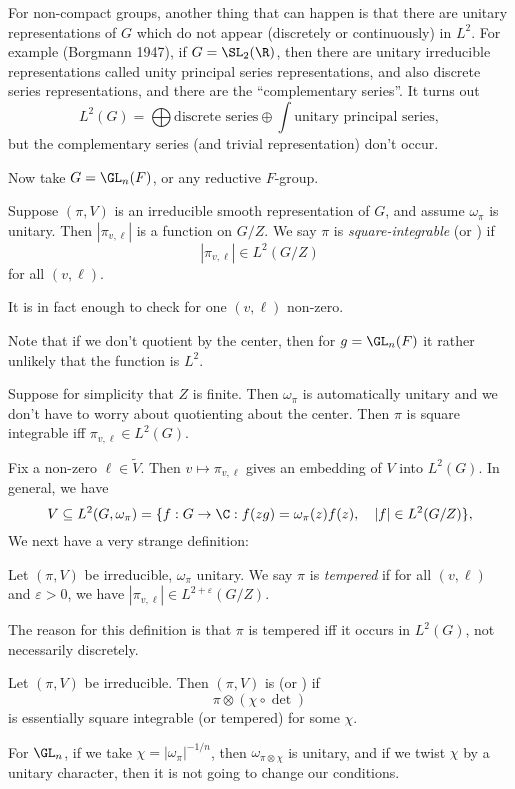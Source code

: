 \documentclass[a4paper]{article}
\begin{document}
For non-compact groups, another thing that can happen is that there are unitary representations of $G$ which do not appear (discretely or continuously) in $L^2$. For example (Borgmann 1947), if $G = \SL_2(\R)$, then there are unitary irreducible representations called unity principal series representations, and also discrete series representations, and there are the ``complementary series''. It turns out %
\[
  L^2(G) = \bigoplus \text{discrete series} \oplus \int \text{unitary principal series},
\]
but the complementary series (and trivial representation) don't occur.

Now take $G = \GL_n(F)$, or any reductive $F$-group.
\begin{defi} 
  Suppose $(\pi, V)$ is an irreducible smooth representation of $G$, and assume $\omega_\pi$ is unitary. Then $|\pi_{v, \ell}|$ is a function on $G/Z$. We say $\pi$ is \emph{square-integrable} (or ) if
  \[
    |\pi_{v, \ell}| \in L^2(G/Z)
  \]
  for all $(v, \ell)$.
\end{defi}
It is in fact enough to check for one $(v, \ell)$ non-zero.

Note that if we don't quotient by the center, then for $g = \GL_n(F)$ it rather unlikely that the function is $L^2$. %

Suppose for simplicity that $Z$ is finite. Then $\omega_\pi$ is automatically unitary and we don't have to worry about quotienting about the center. Then $\pi$ is square integrable iff $\pi_{v, \ell} \in L^2(G)$.

Fix a non-zero $\ell \in \tilde{V}$. Then $v \mapsto \pi_{v, \ell}$ gives an embedding of $V$ into $L^2(G)$. In general, we have
\[
  V \subseteq L^2(G, \omega_\pi) = \{f: G \to \C: f(zg) = \omega_\pi(z) f(z),\quad |f| \in L^2(G/Z)\},
\]
We next have a very strange definition:
\begin{defi}
  Let $(\pi, V)$ be irreducible, $\omega_\pi$ unitary. We say $\pi$ is \emph{tempered} if for all $(v, \ell)$ and $\varepsilon > 0$, we have $|\pi_{v, \ell}| \in L^{2 + \varepsilon}(G/Z)$.
\end{defi}
The reason for this definition is that $\pi$ is tempered iff it occurs in $L^2(G)$, not necessarily discretely. %

\begin{defi}
  Let $(\pi, V)$ be irreducible. Then $(\pi, V)$ is  (or ) if
  \[
    \pi \otimes (\chi \circ \det)
  \]
  is essentially square integrable (or tempered) for some $\chi$.
\end{defi}
For $\GL_n$, if we take $\chi = |\omega_\pi|^{-1/n}$, then $\omega_{\pi \otimes \chi}$ is unitary, and if we twist $\chi$ by a unitary character, then it is not going to change our conditions.
\end{document}

